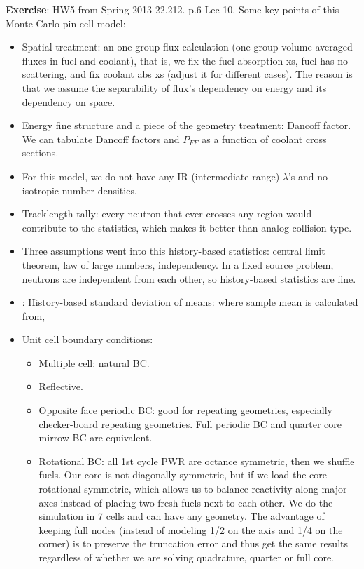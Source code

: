 \documentclass{school-22.211-notes}
\begin{document}
\textbf{Exercise}: HW5 from Spring 2013 22.212. p.6 Lec 10. Some key points of this Monte Carlo pin cell model:  
\begin{itemize}
\item Spatial treatment: an one-group flux calculation (one-group volume-averaged fluxes in fuel and coolant), that is, we fix the fuel absorption xs, fuel has no scattering, and fix coolant abs xs (adjust it for different cases). The reason is that we assume the separability of flux's dependency on energy and its dependency on space. 
\item Energy fine structure and a piece of the geometry treatment: Dancoff factor. We can tabulate Dancoff factors and $P_{FF}$ as a function of coolant cross sections. 
\item For this model, we do not have any IR (intermediate range) $\lambda$'s and no isotropic number densities.
\item Tracklength tally: every neutron that ever crosses any region would contribute to the statistics, which makes it better than analog collision type. 
\item Three assumptions went into this history-based statistics: central limit theorem, law of large numbers, independency. In a fixed source problem, neutrons are independent from each other, so history-based statistics are fine. 
\item {}:
  History-based standard deviation of means:
  where sample mean is calculated from, 
\item Unit cell boundary conditions: 
  \begin{itemize}
    \item Multiple cell: natural BC.
    \item Reflective. 
    \item Opposite face periodic BC: good for repeating geometries, especially checker-board repeating geometries. Full periodic BC and quarter core mirrow BC are equivalent. 
    \item Rotational BC: all 1st cycle PWR are octance symmetric, then we shuffle fuels. Our core is not diagonally symmetric, but if we load the core rotational symmetric, which allows us to balance reactivity along major axes instead of placing two fresh fuels next to each other. We do the simulation in 7 cells and can have any geometry. The advantage of keeping full nodes (instead of modeling 1/2 on the axis and 1/4 on the corner) is to preserve the truncation error and thus get the same results regardless of whether we are solving quadrature, quarter or full core. 
  \end{itemize}
\end{itemize}
\end{document}
